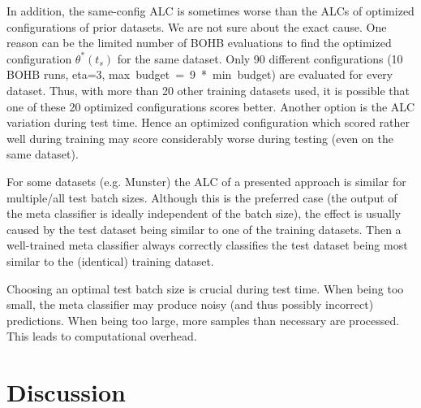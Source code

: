 \documentclass{article}
\begin{document}
In addition, the same-config ALC is sometimes worse than the ALCs of optimized configurations of prior datasets. We are not sure about the exact cause. One reason can be the limited number of BOHB evaluations to find the optimized configuration $\theta^*(t_s)$ for the same dataset. Only 90 different configurations (10 BOHB runs, eta=3, max~budget~=~9~*~min~budget) are evaluated for every dataset. Thus, with more than 20 other training datasets used, it is possible that one of these 20 optimized configurations scores better. Another option is the ALC variation during test time. Hence an optimized configuration which scored rather well during training may score considerably worse during testing (even on the same dataset).

For some datasets (e.g. Munster) the ALC of a presented approach is similar for multiple/all test batch sizes. Although this is the preferred case (the output of the meta classifier is ideally independent of the batch size), the effect is usually caused by the test dataset being similar to one of the training datasets. Then a well-trained meta classifier always correctly classifies the test dataset being most similar to the (identical) training dataset.

Choosing an optimal test batch size is crucial during test time. When being too small, the meta classifier may produce noisy (and thus possibly incorrect) predictions. When being too large, more samples than necessary are processed. This leads to computational overhead. 

\section{Discussion}
\label{sec:discussion}
\end{document}
